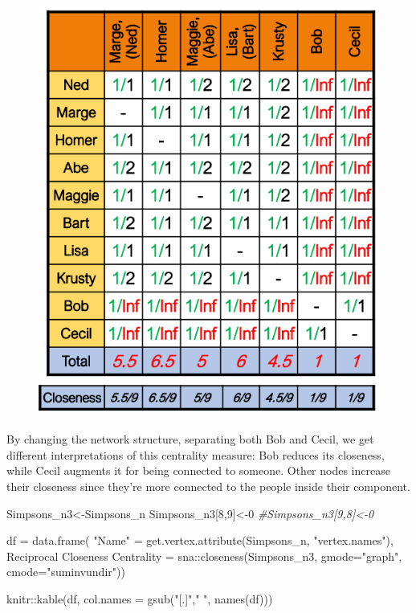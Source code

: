 \documentclass[
  notitlepage,
  onecolumn,
  openany]{book}
\newenvironment{Shaded}{\begin{snugshade}}{\end{snugshade}}
\newcommand{\AttributeTok}[1]{\textcolor[rgb]{0.77,0.63,0.00}{#1}}
\newcommand{\CommentTok}[1]{\textcolor[rgb]{0.56,0.35,0.01}{\textit{#1}}}
\newcommand{\DecValTok}[1]{\textcolor[rgb]{0.00,0.00,0.81}{#1}}
\newcommand{\FunctionTok}[1]{\textcolor[rgb]{0.00,0.00,0.00}{#1}}
\newcommand{\NormalTok}[1]{#1}
\newcommand{\OtherTok}[1]{\textcolor[rgb]{0.56,0.35,0.01}{#1}}
\newcommand{\SpecialCharTok}[1]{\textcolor[rgb]{0.00,0.00,0.00}{#1}}
\newcommand{\StringTok}[1]{\textcolor[rgb]{0.31,0.60,0.02}{#1}}
\begin{document}
\begin{figure}[h!]

{\centering \includegraphics[width=0.5\linewidth]{images/04-Centrality/Untitled 4} 

}

\end{figure}

By changing the network structure, separating both Bob and Cecil, we get different interpretations of this centrality measure: Bob reduces its closeness, while Cecil augments it for being connected to someone. Other nodes increase their closeness since they're more connected to the people inside their component.

\begin{Shaded}
\begin{Highlighting}[]
\NormalTok{Simpsons\_n3}\OtherTok{\textless{}{-}}\NormalTok{Simpsons\_n}
\NormalTok{Simpsons\_n3[}\DecValTok{8}\NormalTok{,}\DecValTok{9}\NormalTok{]}\OtherTok{\textless{}{-}}\DecValTok{0}
\CommentTok{\#Simpsons\_n3[9,8]\textless{}{-}0}

\NormalTok{df }\OtherTok{=} \FunctionTok{data.frame}\NormalTok{(}
    \StringTok{"Name"} \OtherTok{=} \FunctionTok{get.vertex.attribute}\NormalTok{(Simpsons\_n, }\StringTok{"vertex.names"}\NormalTok{),}
    \StringTok{\textasciigrave{}}\AttributeTok{Reciprocal Closeness Centrality}\StringTok{\textasciigrave{}} \OtherTok{=}\NormalTok{ sna}\SpecialCharTok{::}\FunctionTok{closeness}\NormalTok{(Simpsons\_n3, }
                                                       \AttributeTok{gmode=}\StringTok{"graph"}\NormalTok{,}
                                                       \AttributeTok{cmode=}\StringTok{"suminvundir"}\NormalTok{))}

\NormalTok{knitr}\SpecialCharTok{::}\FunctionTok{kable}\NormalTok{(df, }\AttributeTok{col.names =} \FunctionTok{gsub}\NormalTok{(}\StringTok{"[.]"}\NormalTok{,}\StringTok{" "}\NormalTok{, }\FunctionTok{names}\NormalTok{(df)))}
\end{Highlighting}
\end{Shaded}
\end{document}
